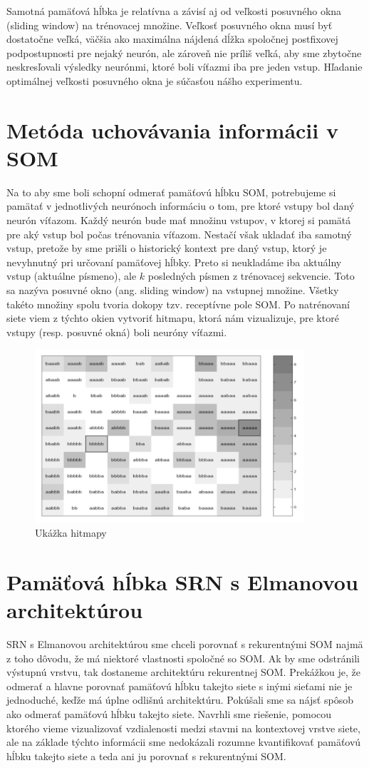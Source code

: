 Samotná pamäťová hĺbka je relatívna a závisí aj od veľkosti posuvného okna (sliding window) na trénovacej množine.
Veľkosť posuvného okna musí byť dostatočne veľká, väčšia ako maximálna nájdená
dĺžka spoločnej postfixovej podpostupnosti pre nejaký neurón, ale zároveň nie príliš veľká, aby sme zbytočne neskresľovali výsledky neurónmi, ktoré boli víťazmi iba pre jeden vstup.
Hľadanie optimálnej veľkosti posuvného okna je súčasťou nášho experimentu.

\section{Metóda uchovávania informácii v SOM}
Na to aby sme boli schopní odmerať pamäťovú hĺbku SOM, potrebujeme si pamätať v jednotlivých
neurónoch informáciu o tom, pre ktoré vstupy bol daný neurón víťazom.
Každý neurón bude mať množinu vstupov, v ktorej si pamätá pre aký vstup bol počas trénovania víťazom. 
Nestačí však ukladať iba samotný vstup, pretože by sme prišli o historický kontext pre daný vstup, 
ktorý je nevyhnutný pri určovaní pamäťovej hĺbky. 
Preto si neukladáme iba aktuálny vstup (aktuálne písmeno), 
ale $k$ posledných písmen z trénovacej sekvencie.
Toto sa nazýva posuvné okno (ang. sliding window) na vstupnej množine. 
Všetky takéto množiny spolu tvoria dokopy tzv. receptívne pole SOM.
Po natrénovaní siete viem z týchto okien vytvoriť hitmapu, 
ktorá nám vizualizuje, pre ktoré vstupy (resp. posuvné okná) boli neuróny víťazmi.

\begin{figure}[H]
	\centering
	\includegraphics[width=10cm]{assets/receptive_field}
	\caption{Ukážka hitmapy}
\end{figure}

\section{Pamäťová hĺbka SRN s Elmanovou architektúrou}
SRN s Elmanovou architektúrou sme chceli porovnať s rekurentnými SOM najmä z toho dôvodu, že má niektoré vlastnosti spoločné 
so SOM. Ak by sme odstránili výstupnú vrstvu, tak dostaneme architektúru rekurentnej SOM.
Prekážkou je, že odmerať a hlavne porovnať pamäťovú hĺbku takejto siete s inými sieťami nie je jednoduché, keďže má úplne odlišnú architektúru.
Pokúšali sme sa nájsť spôsob ako odmerať pamäťovú hĺbku takejto siete.
Navrhli sme riešenie, pomocou ktorého vieme vizualizovať vzdialenosti medzi stavmi na kontextovej vrstve siete, ale
na základe týchto informácii sme nedokázali rozumne kvantifikovať pamäťovú hĺbku takejto siete a teda 
ani ju porovnať s rekurentnými SOM.


